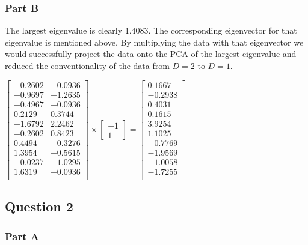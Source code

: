 \documentclass[12pt]{article}
\begin{document}
\subsubsection{Part B}
The largest eigenvalue is clearly 1.4083. The corresponding eigenvector for that eigenvalue is mentioned above. By multiplying the data with that eigenvector we would successfully project the data onto the PCA of the largest eigenvalue and reduced the conventionality of the data from $D=2$ to $D=1$.
\begin{center}
    
    $\begin{bmatrix}
        -0.2602 & -0.0936\\
        -0.9697 & -1.2635\\
        -0.4967 & -0.0936\\
        0.2129 & 0.3744\\
        -1.6792 & 2.2462\\
        -0.2602 & 0.8423\\
        0.4494 & -0.3276\\
        1.3954 & -0.5615\\
        -0.0237 & -1.0295\\
        1.6319 & -0.0936\\
    \end{bmatrix}
    \times
    \begin{bmatrix}
        -1 \\
        1
    \end{bmatrix}
    =
    \begin{bmatrix}
        0.1667\\
        -0.2938\\
        0.4031\\
        0.1615\\
        3.9254\\
        1.1025\\
        -0.7769\\
        -1.9569\\
        -1.0058\\
        -1.7255\\
    \end{bmatrix}
    $
    
\end{center}

\subsection{Question 2}
\subsubsection{Part A}
\end{document}
